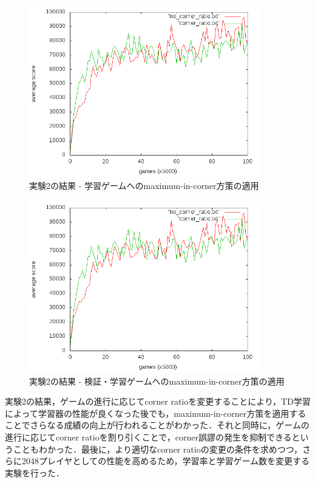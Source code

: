 \documentclass{suribt}
\begin{document}
\begin{figure}[t]
	\begin{center}
	\includegraphics[width=10cm]{figure_008.png}
	\caption{実験2の結果 - 学習ゲームへのmaximum-in-corner方策の適用}
	\label{figure_008}
	\end{center}
\end{figure}

\begin{figure}[t]
	\begin{center}
	\includegraphics[width=10cm]{figure_009.png}
	\caption{実験2の結果 - 検証・学習ゲームへのmaximum-in-corner方策の適用}
	\label{figure_009}
	\end{center}
\end{figure}

実験2の結果，ゲームの進行に応じてcorner ratioを変更することにより，TD学習によって学習器の性能が良くなった後でも，maximum-in-corner方策を適用することでさらなる成績の向上が行われることがわかった．それと同時に，ゲームの進行に応じてcorner ratioを割り引くことで，corner誤謬の発生を抑制できるということもわかった．最後に，より適切なcorner ratioの変更の条件を求めつつ，さらに2048プレイヤとしての性能を高めるため，学習率と学習ゲーム数を変更する実験を行った．
\end{document}
